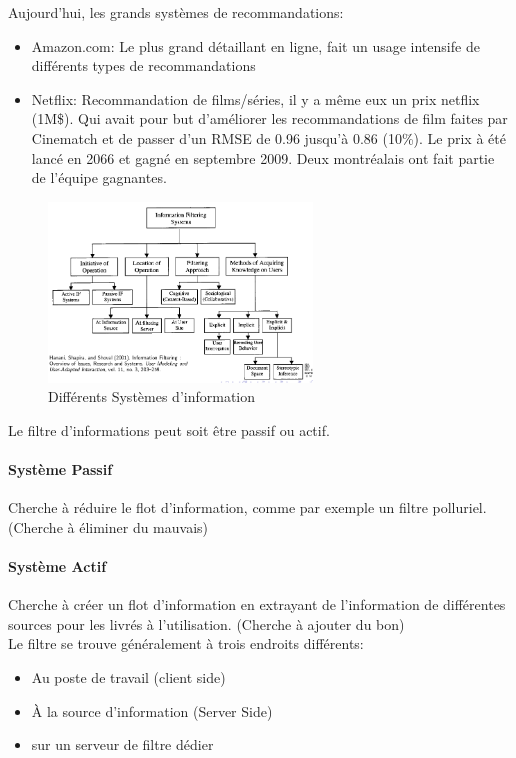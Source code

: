 \documentclass[oneside]{book}
\begin{document}
Aujourd'hui, les grands systèmes de recommandations:
\begin{itemize}
\item Amazon.com: Le plus grand détaillant en ligne, fait un usage intensife de différents types de recommandations
\item Netflix: Recommandation de films/séries, il y a même eux un prix netflix (1M\$). Qui avait pour but d'améliorer les recommandations de film faites par Cinematch et de passer d'un RMSE de 0.96 jusqu'à 0.86 (10\%). Le prix à été lancé en 2066 et gagné en septembre 2009. Deux montréalais ont fait partie de l'équipe gagnantes.\\


\end{itemize} 
\begin{figure}[!ht]
\centering
\includegraphics[width = 7cm]{types_systeme_information.png}
\caption{Différents Systèmes d'information}
\label{fig:Systeme_informations}
\end{figure}

Le filtre d'informations peut soit être passif ou actif.
\paragraph{Système Passif} Cherche à réduire le flot d'information, comme par exemple un filtre polluriel. (Cherche à éliminer du mauvais)
\paragraph{Système Actif} Cherche à créer un flot d'information en extrayant de l'information de différentes sources pour les livrés à l'utilisation. (Cherche à ajouter du bon)\\

Le filtre se trouve généralement à trois endroits différents:
\begin{itemize}
\item Au poste de travail (client side)
\item À la source d'information (Server Side)
\item sur un serveur de filtre dédier
\end{itemize}
\end{document}
